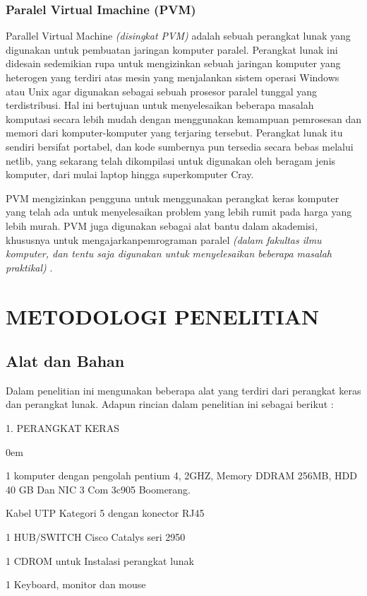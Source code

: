 \documentclass{jtetiproposalskripsi}
\begin{document}
\subsection{Paralel Virtual Imachine (PVM)}
Parallel Virtual Machine \emph{(disingkat PVM)} adalah sebuah perangkat lunak yang digunakan untuk pembuatan jaringan komputer paralel. Perangkat lunak ini didesain sedemikian rupa untuk mengizinkan sebuah jaringan komputer yang heterogen yang terdiri atas mesin yang menjalankan sistem operasi Windows atau Unix agar digunakan sebagai sebuah prosesor paralel tunggal yang terdistribusi. Hal ini bertujuan untuk menyelesaikan beberapa masalah komputasi secara lebih mudah dengan menggunakan kemampuan pemrosesan dan memori dari komputer-komputer yang terjaring tersebut. Perangkat lunak itu sendiri bersifat portabel, dan kode sumbernya pun tersedia secara bebas melalui netlib, yang sekarang telah dikompilasi untuk digunakan oleh beragam jenis komputer, dari mulai laptop hingga superkomputer Cray. 

PVM mengizinkan pengguna untuk menggunakan perangkat keras komputer yang telah ada untuk menyelesaikan problem yang lebih rumit pada harga yang lebih murah. PVM juga digunakan sebagai alat bantu dalam akademisi, khususnya untuk mengajarkanpemrograman paralel \emph{(dalam fakultas ilmu komputer, dan tentu saja digunakan untuk menyelesaikan beberapa masalah praktikal)} .




\chapter{METODOLOGI PENELITIAN}

\section{Alat dan Bahan}
Dalam penelitian ini mengunakan beberapa alat yang terdiri dari perangkat keras dan perangkat lunak. Adapun rincian dalam penelitian ini sebagai berikut :
\vspace{1cm}

1. PERANGKAT KERAS
\vspace{-0.5cm}
\begin{enumerate}[a.]
\begin{singlespace}
\itemsep0em
\item 1 komputer dengan pengolah pentium 4, 2GHZ, Memory DDRAM 256MB, HDD 40 GB Dan NIC 3 Com 3c905 Boomerang.
\item Kabel UTP Kategori 5 dengan konector RJ45
\item 1 HUB/SWITCH Cisco Catalys seri 2950
\item 1 CDROM untuk Instalasi perangkat lunak
\item 1 Keyboard, monitor dan mouse
\end{singlespace}
\end{enumerate}
\end{document}
